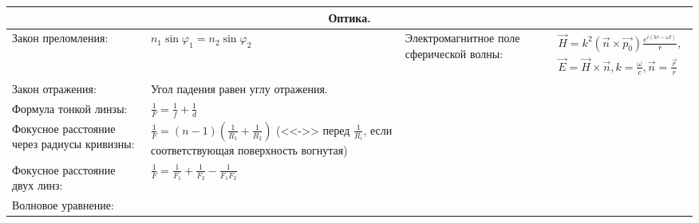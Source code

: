 \documentclass{article}
\begin{document}
\begin{tabular}{ |p{4.1cm}|p{5.4cm}|p{4.1cm}|p{4.4cm}|  }
\hline
\multicolumn{4}{|c|}{Оптика.} \\
\hline
Закон преломления:                                                           &  %
$n_1 \sin{\varphi_1} = n_2 \sin{\varphi_2}$                                  &  %
Электромагнитное поле сферической волны:                                     &  %
$\begin{aligned}
\vec{H} = k^2 (\vec{n} \times \vec{p_0}) \frac{e^{i(kr - \omega t)}}{r}, \\
\vec{E} = \vec{H} \times \vec{n}, k = \frac{\omega}{c},
\vec{n} = \frac{\vec{r}}{r}
\end{aligned}$                                                               \\ %
\hline
Закон отражения:                                                             &  %
Угол падения равен углу отражения.                                           &  %
                                                                             &  %
                                                                             \\ %
\hline
Формула тонкой линзы:                                                        &  %
$\frac{1}{F} = \frac{1}{f} + \frac{1}{d}$                                    &  %
                                                                             &  %
                                                                             \\ %
\hline
Фокусное расстояние через радиусы кривизны:                                  &  %
$\frac{1}{F} = (n-1)(\frac{1}{R_1} + \frac{1}{R_2})$ (<<->> перед
$\frac{1}{R_i}$, если соответствующая поверхность вогнутая)                  &  %
                                                                             &  %
                                                                             \\ %
\hline
Фокусное расстояние двух линз:                                               &  %
$\frac{1}{F} = \frac{1}{F_1} + \frac{1}{F_2} - \frac{1}{F_1 F_2}$            &  %
                                                                             &  %
                                                                             \\ %
\hline
Волновое уравнение:                                                          &  %

\end{tabular}
\end{document}
